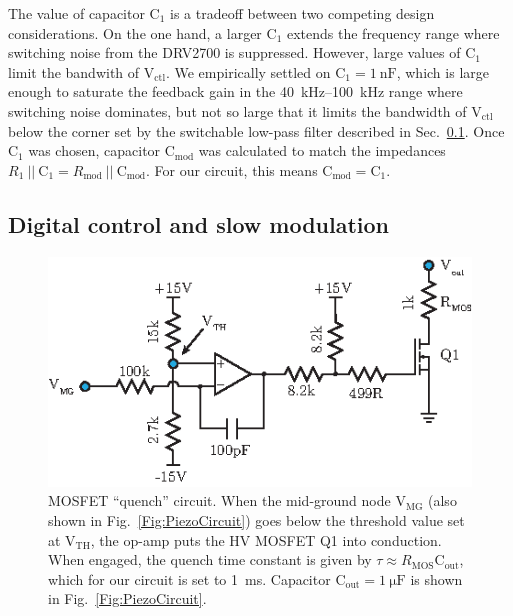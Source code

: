 \documentclass[aip,rsi,reprint]{revtex4-1} %
\begin{document}
The value of capacitor $\text{C}_1$ is a tradeoff between two competing design considerations.
On the one hand, a larger $\text{C}_1$ extends the frequency range where switching noise from the DRV2700 is suppressed.
However, large values of $\text{C}_1$ limit the bandwith of $\text{V}_\text{ctl}$.
We empirically settled on $\text{C}_1 = \SI{1}{\nano\farad}$, which is large enough to saturate the feedback gain in the \SI{40}{\kilo\hertz}--\SI{100}{\kilo\hertz} range where switching noise dominates, but not so large that it limits the bandwidth of $\text{V}_\text{ctl}$ below the corner set by the switchable low-pass filter described in Sec.~\ref{Sec:SlowModulationMOS}.
Once $\text{C}_1$ was chosen, capacitor $\text{C}_\text{mod}$ was calculated to match the impedances $R_1~||~\text{C}_1 = R_\text{mod}~||~\text{C}_\text{mod}$.
For our circuit, this means $\text{C}_\text{mod} = \text{C}_1$.


\subsection{Digital control and slow modulation}
\label{Sec:SlowModulationMOS}

\begin{figure}[t!]
\includegraphics[width=\columnwidth]{MOS}
\caption{MOSFET ``quench'' circuit.
When the mid-ground node $\text{V}_\text{MG}$ (also shown in Fig.~\ref{Fig:PiezoCircuit}) goes below the threshold value set at $\text{V}_\text{TH}$, the op-amp puts the HV MOSFET Q1 into conduction.
When engaged, the quench time constant is given by $\tau \approx R_\text{MOS} \text{C}_\text{out}$, which for our circuit is set to \SI{1}{\milli\second}. Capacitor $\text{C}_\text{out}=\SI{1}{\micro\farad}$ is shown in Fig.~\ref{Fig:PiezoCircuit}.
\label{Fig:MOS}}
\end{figure}
\end{document}
